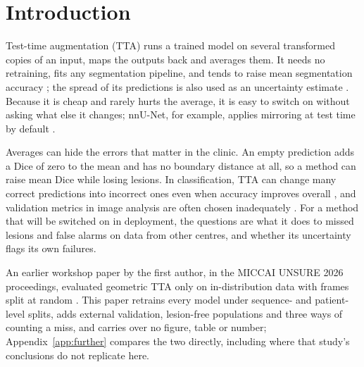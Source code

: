 \section{Introduction}
\label{sec:intro}

Test-time augmentation (TTA) runs a trained model on several transformed copies of an input, maps the outputs back and averages them. It needs no retraining, fits any segmentation pipeline, and tends to raise mean segmentation accuracy \cite{wang2019aleatoric,moshkov2020tta}; the spread of its predictions is also used as an uncertainty estimate \cite{wang2019aleatoric}. Because it is cheap and rarely hurts the average, it is easy to switch on without asking what else it changes; nnU-Net, for example, applies mirroring at test time by default \cite{isensee2021nnunet}.

Averages can hide the errors that matter in the clinic. An empty prediction adds a Dice of zero to the mean and has no boundary distance at all, so a method can raise mean Dice while losing lesions. In classification, TTA can change many correct predictions into incorrect ones even when accuracy improves overall \cite{shanmugam2021better}, and validation metrics in image analysis are often chosen inadequately \cite{maierhein2024metrics,reinke2024pitfalls}. For a method that will be switched on in deployment, the questions are what it does to missed lesions and false alarms on data from other centres, and whether its uncertainty flags its own failures.

An earlier workshop paper by the first author, in the MICCAI UNSURE 2026 proceedings, evaluated geometric TTA only on in-distribution data with frames split at random \cite{kashyap2026unsure}. This paper retrains every model under sequence- and patient-level splits, adds external validation, lesion-free populations and three ways of counting a miss, and carries over no figure, table or number; Appendix~\ref{app:further} compares the two directly, including where that study's conclusions do not replicate here.


